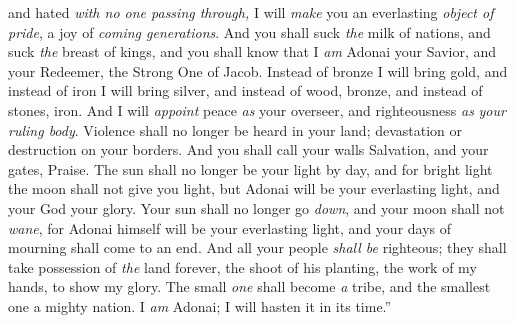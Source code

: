 \begin{biblechapter}
and hated \textit{with no one passing through,} 
I will \textit{make} you an everlasting \textit{object of pride}, 
a joy of \textit{coming generations}.
\verse And you shall suck \textit{the} milk of nations, 
and suck \textit{the} breast of kings, 
and you shall know that I \textit{am} Adonai your Savior, 
and your Redeemer, the Strong One of Jacob.
\verse Instead of bronze I will bring gold, 
and instead of iron I will bring silver, 
and instead of wood, bronze, 
and instead of stones, iron. 
And I will \textit{appoint} peace \textit{as} your overseer, 
and righteousness \textit{as} \textit{your ruling body}.
\verse Violence shall no longer be heard in your land; 
devastation or destruction on your borders. 
And you shall call your walls Salvation, 
and your gates, Praise.
\verse The sun shall no longer be your light by day, 
and for bright light the moon shall not give you light, 
but Adonai will be your everlasting light, 
and your God your glory.
\verse Your sun shall no longer go \textit{down}, 
and your moon shall not \textit{wane}, 
for Adonai himself will be your everlasting light, 
and your days of mourning shall come to an end.
\verse And all your people \textit{shall be} righteous; 
they shall take possession of \textit{the} land forever, 
the shoot of his planting, 
the work of my hands, to show my glory.
\verse The small \textit{one} shall become \textit{a} tribe, 
and the smallest one a mighty nation. I \textit{am} Adonai; I will hasten it in its time.”
\end{biblechapter}

